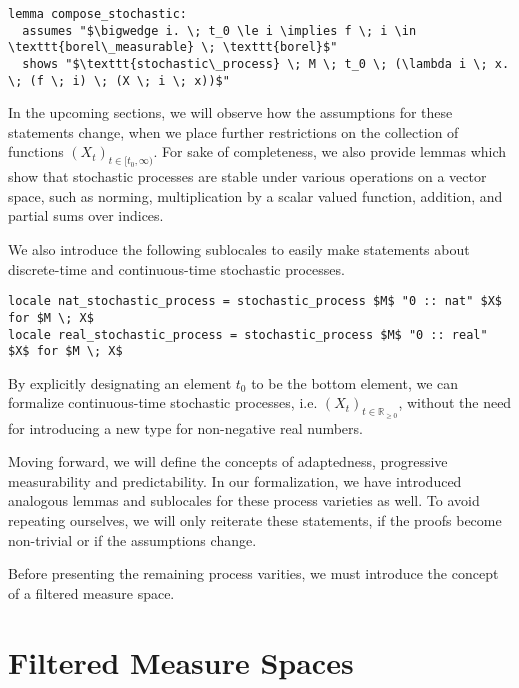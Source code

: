\begin{isalemma}
{\small
\begin{lstlisting}[style=isabelle]
lemma compose_stochastic:
  assumes "$\bigwedge i. \; t_0 \le i \implies f \; i \in \texttt{borel\_measurable} \; \texttt{borel}$"
  shows "$\texttt{stochastic\_process} \; M \; t_0 \; (\lambda i \; x. \; (f \; i) \; (X \; i \; x))$"
  \end{lstlisting}
}
\end{isalemma}

In the upcoming sections, we will observe how the assumptions for these statements change, when we place further restrictions on the collection of functions $(X_t)_{t \in [t_0,\infty)}$. For sake of completeness, we also provide lemmas which show that stochastic processes are stable under various operations on a vector space, such as norming, multiplication by a scalar valued function, addition, and partial sums over indices.

We also introduce the following sublocales to easily make statements about discrete-time and continuous-time stochastic processes.

\begin{isadefinition}
{\small
\begin{lstlisting}[style=isabelle]
locale nat_stochastic_process = stochastic_process $M$ "0 :: nat" $X$ for $M \; X$
locale real_stochastic_process = stochastic_process $M$ "0 :: real" $X$ for $M \; X$
\end{lstlisting}
}
\end{isadefinition}

By explicitly designating an element $t_0$ to be the bottom element, we can formalize continuous-time stochastic processes, i.e. $(X_t)_{t \in \mathbb{R}_{\ge 0}}$, without the need for introducing a new type for non-negative real numbers. 

\begin{remark}
Moving forward, we will define the concepts of adaptedness, progressive measurability and predictability. In our formalization, we have introduced analogous lemmas and sublocales for these process varieties as well. To avoid repeating ourselves, we will only reiterate these statements, if the proofs become non-trivial or if the assumptions change.
\end{remark}

Before presenting the remaining process varities, we must introduce the concept of a filtered measure space.

\section{Filtered Measure Spaces}

